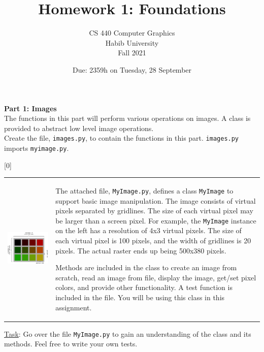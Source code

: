 \documentclass[addpoints]{exam}
\title{Homework 1: Foundations}
\author{CS 440 Computer Graphics\\Habib University\\Fall 2021}
\date{Due: 2359h on Tuesday, 28 September}
\begin{document}
\maketitle

\begin{questions}

\begin{EnvFullwidth}
  {\Large\bf Part 1: Images}\\

    The functions in this part will perform various operations on images. A class is provided to abstract low level image operations. \\ Create the file, \texttt{images.py}, to contain the functions in this part. \texttt{images.py} imports \texttt{myimage.py}.
  \end{EnvFullwidth}
  

[0]

  \noindent\begin{tabularx}{\textwidth}{lX}
    \includegraphics[width=.45\textwidth,align=t]{demo} &

    The attached file, \texttt{MyImage.py}, defines a class \texttt{MyImage} to support basic image manipulation. The image consists of virtual pixels separated by gridlines. The size of each virtual pixel may be larger than a screen pixel. For example, the \texttt{MyImage} instance on the left has a resolution of 4x3 virtual pixels. The size of each virtual pixel is 100 pixels, and the width of gridlines is 20 pixels. The actual raster ends up being 500x380 pixels.

    Methods are included in the class to create an image from scratch, read an image from file, display the image, get/set pixel colors, and provide other functionality. A test function is included in the file. You will be using this class in this assignment.
  \end{tabularx}

  \underline{Task}: Go over the file \texttt{MyImage.py} to gain an understanding of the class and its methods. Feel free to write your own tests.


\end{questions}
\end{document}

